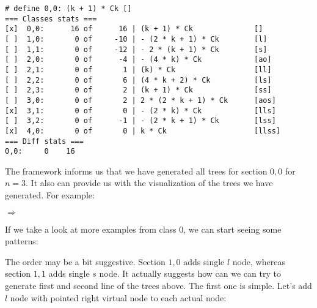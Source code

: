 \documentclass[final]{article}
\theoremstyle{definition}
\theoremstyle{remark}
\newcommand{\includeinlinesvg}[2]{\begin{minipage}{#1\textwidth}\end{minipage}}
\begin{document}
\begin{lstlisting}
# define 0,0: (k + 1) * Ck []
=== Classes stats ===
[x]  0,0:      16 of      16 | (k + 1) * Ck              []
[ ]  1,0:       0 of     -10 | - (2 * k + 1) * Ck        [l]
[ ]  1,1:       0 of     -12 | - 2 * (k + 1) * Ck        [s]
[ ]  2,0:       0 of      -4 | - (4 * k) * Ck            [ao]
[ ]  2,1:       0 of       1 | (k) * Ck                  [ll]
[ ]  2,2:       0 of       6 | (4 * k + 2) * Ck          [ls]
[ ]  2,3:       0 of       2 | (k + 1) * Ck              [ss]
[ ]  3,0:       0 of       2 | 2 * (2 * k + 1) * Ck      [aos]
[x]  3,1:       0 of       0 | - (2 * k) * Ck            [lls]
[ ]  3,2:       0 of      -1 | - (2 * k + 1) * Ck        [lss]
[x]  4,0:       0 of       0 | k * Ck                    [llss]
=== Diff stats ===
0,0:     0    16
\end{lstlisting}

The framework informs us that we have generated all trees for section \(0,0\) for \(n = 3\). It also can provide us with the visualization of the trees we have generated. For example:

\includeinlinesvg{.19}{trees_00__4_base}%
\(\Rightarrow\)
\includeinlinesvg{.19}{trees_00__4}%
\includeinlinesvg{.19}{trees_00__5}%
\includeinlinesvg{.19}{trees_00__6}%
\includeinlinesvg{.19}{trees_00__7}%

If we take a look at more examples from class \(0\), we can start seeing some patterns:

\includeinlinesvg{.33}{trees_00__2}%
\includeinlinesvg{.33}{trees_00__3}%
\includeinlinesvg{.33}{trees_00__7}%

\includeinlinesvg{.33}{trees_00__4}%
\includeinlinesvg{.33}{trees_00__12}%
\includeinlinesvg{.33}{trees_00__13}%

\includeinlinesvg{.16}{trees_00__0}%
\includeinlinesvg{.16}{trees_00__1}%
\includeinlinesvg{.16}{trees_00__5}%
\includeinlinesvg{.16}{trees_00__6}%
\includeinlinesvg{.16}{trees_00__14}%
\includeinlinesvg{.16}{trees_00__15}%

\includeinlinesvg{.25}{trees_00__8}%
\includeinlinesvg{.25}{trees_00__9}%
\includeinlinesvg{.25}{trees_00__10}%
\includeinlinesvg{.25}{trees_00__11}%

The order may be a bit suggestive. Section \(1,0\) adds single \(l\) node, whereas section \(1,1\) adds single \(s\) node. It actually suggests how can we can try to generate first and second line of the trees above. The first one is simple. Let's add \(l\) node with pointed right virtual node to each actual node:
\end{document}
